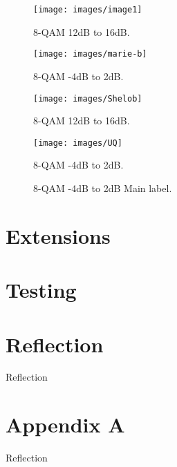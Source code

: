 \documentclass[12pt]{article}
\numberwithin{equation}{section} %
\numberwithin{figure}{section} %
\numberwithin{table}{section} %
\begin{document}
		\begin{figure} [H]
			\centering
			\begin{minipage}[b]{0.45\textwidth}
				\centering
				\texttt{[image: images/image1]}
				\caption*{8-QAM 12dB to 16dB.}
				\label{fig:16-QAM}	
			\end{minipage}
			\hfill
			\begin{minipage}[b]{0.45\textwidth}
				\centering
				\texttt{[image: images/marie-b]}
				\caption*{8-QAM -4dB to 2dB.}
				\label{fig:32-QAM}	
			\end{minipage}
			\begin{minipage}[b]{0.45\textwidth}
				\centering
				\texttt{[image: images/Shelob]}
				\caption*{8-QAM 12dB to 16dB.}
				\label{fig:64-QAM}	
			\end{minipage}
			\hfill
			\begin{minipage}[b]{0.45\textwidth}
				\centering
				\texttt{[image: images/UQ]}
				\caption*{8-QAM -4dB to 2dB.}
				\label{fig:128-QAM}	
			\end{minipage}
			\caption{8-QAM -4dB to 2dB Main label.}
			\label{fig:QAM-schemes}
		\end{figure}
\newpage
\section{Extensions}

\newpage
\section{Testing}

\newpage
\section{Reflection}
Reflection

\newpage
\section{Appendix A}
Reflection

\begin{flushleft}
	
	
\end{flushleft}
\end{document}
